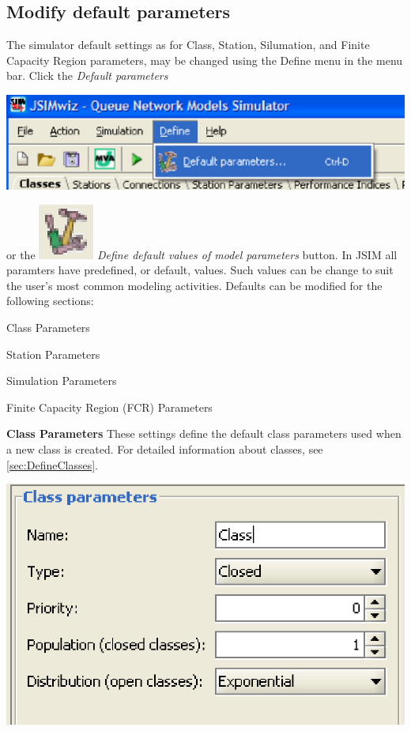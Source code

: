 \begin{description*}
\section{Modify default parameters}
\label{sec:ModifyDefaultParameters}
The simulator default settings as for Class, Station, Silumation, and Finite Capacity Region parameters, may be changed using the Define menu in the menu bar. Click the \emph{Default parameters}
\begin{center}
\includegraphics[scale=.5]{img/jsim/define1.eps} 
\end{center}
or the \includegraphics[scale=.5]{img/jsim/define2.eps} \emph{Define default values of model parameters} button.
In JSIM all paramters have predefined, or default, values. Such values can be change to suit the user's most common modeling activities. Defaults can be modified for the following sections:
\begin{itemize*}
\item Class Parameters
\item Station Parameters
\item Simulation Parameters
\item Finite Capacity Region (FCR) Parameters
\end{itemize*}
\textbf{Class Parameters}
These settings define the default class parameters used when a new class is created. For detailed information about classes, see \autoref{sec:DefineClasses}.
\begin{center}
\includegraphics[scale=.5]{img/jsim/Class_Parameters.eps}

\end{center}
\end{description*}
